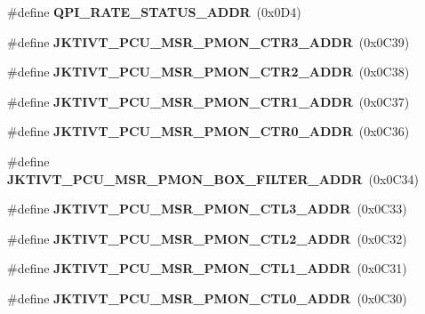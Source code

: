 \begin{DoxyCompactItemize}
\item 
\#define {\bfseries Q\+P\+I\+\_\+\+R\+A\+T\+E\+\_\+\+S\+T\+A\+T\+U\+S\+\_\+\+A\+D\+D\+R}~(0x0\+D4)\label{types_8h_acfc0a6e15dc1a230627717789bf9ccce}

\item 
\#define {\bfseries J\+K\+T\+I\+V\+T\+\_\+\+P\+C\+U\+\_\+\+M\+S\+R\+\_\+\+P\+M\+O\+N\+\_\+\+C\+T\+R3\+\_\+\+A\+D\+D\+R}~(0x0\+C39)\label{types_8h_a94e80e664b4d2b604128bef0be06fe10}

\item 
\#define {\bfseries J\+K\+T\+I\+V\+T\+\_\+\+P\+C\+U\+\_\+\+M\+S\+R\+\_\+\+P\+M\+O\+N\+\_\+\+C\+T\+R2\+\_\+\+A\+D\+D\+R}~(0x0\+C38)\label{types_8h_a885b6391b439a80833f8ef07cd3234d5}

\item 
\#define {\bfseries J\+K\+T\+I\+V\+T\+\_\+\+P\+C\+U\+\_\+\+M\+S\+R\+\_\+\+P\+M\+O\+N\+\_\+\+C\+T\+R1\+\_\+\+A\+D\+D\+R}~(0x0\+C37)\label{types_8h_a001e67bf4a4feb7152a931b060723a04}

\item 
\#define {\bfseries J\+K\+T\+I\+V\+T\+\_\+\+P\+C\+U\+\_\+\+M\+S\+R\+\_\+\+P\+M\+O\+N\+\_\+\+C\+T\+R0\+\_\+\+A\+D\+D\+R}~(0x0\+C36)\label{types_8h_a9ede207a8291e0310820bbfdc37aef1d}

\item 
\#define {\bfseries J\+K\+T\+I\+V\+T\+\_\+\+P\+C\+U\+\_\+\+M\+S\+R\+\_\+\+P\+M\+O\+N\+\_\+\+B\+O\+X\+\_\+\+F\+I\+L\+T\+E\+R\+\_\+\+A\+D\+D\+R}~(0x0\+C34)\label{types_8h_a7e85eccc481d06a6519bfd51154c7ae6}

\item 
\#define {\bfseries J\+K\+T\+I\+V\+T\+\_\+\+P\+C\+U\+\_\+\+M\+S\+R\+\_\+\+P\+M\+O\+N\+\_\+\+C\+T\+L3\+\_\+\+A\+D\+D\+R}~(0x0\+C33)\label{types_8h_ab97bae97fd7d1c56857e5f89c119173f}

\item 
\#define {\bfseries J\+K\+T\+I\+V\+T\+\_\+\+P\+C\+U\+\_\+\+M\+S\+R\+\_\+\+P\+M\+O\+N\+\_\+\+C\+T\+L2\+\_\+\+A\+D\+D\+R}~(0x0\+C32)\label{types_8h_a178bd4aecdb96cb83d4de4f07ffec300}

\item 
\#define {\bfseries J\+K\+T\+I\+V\+T\+\_\+\+P\+C\+U\+\_\+\+M\+S\+R\+\_\+\+P\+M\+O\+N\+\_\+\+C\+T\+L1\+\_\+\+A\+D\+D\+R}~(0x0\+C31)\label{types_8h_a0a9b3838ddd114ec631262849f2734ce}

\item 
\#define {\bfseries J\+K\+T\+I\+V\+T\+\_\+\+P\+C\+U\+\_\+\+M\+S\+R\+\_\+\+P\+M\+O\+N\+\_\+\+C\+T\+L0\+\_\+\+A\+D\+D\+R}~(0x0\+C30)\label{types_8h_a1a3668e652ba91a65d67f5384fa8d3fb}


\end{DoxyCompactItemize}
